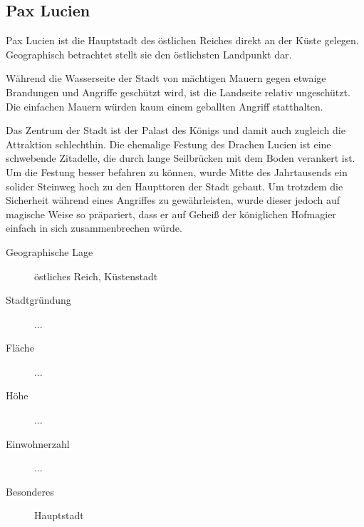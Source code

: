 \subsection{Pax Lucien}
\par Pax Lucien ist die Hauptstadt des östlichen Reiches direkt an der Küste gelegen. Geographisch betrachtet
stellt sie den östlichsten Landpunkt dar.
\par Während die Wasserseite der Stadt von mächtigen Mauern gegen etwaige Brandungen und Angriffe geschützt wird,
ist die Landseite relativ ungeschützt. Die einfachen Mauern würden kaum einem geballten Angriff statthalten.
\par Das Zentrum der Stadt ist der Palast des Königs und damit auch zugleich die Attraktion schlechthin. Die ehemalige
Festung des Drachen Lucien ist eine schwebende Zitadelle, die durch lange Seilbrücken mit dem Boden verankert ist.
Um die Festung besser befahren zu können, wurde Mitte des Jahrtausends ein solider Steinweg hoch zu den Haupttoren
der Stadt gebaut. Um trotzdem die Sicherheit während eines Angriffes zu gewährleisten, wurde dieser jedoch auf
magische Weise so präpariert, dass er auf Geheiß der königlichen Hofmagier einfach in sich zusammenbrechen würde.

\begin{description}
\item [Geographische Lage] östliches Reich, Küstenstadt
\item [Stadtgründung] ...
\item [Fläche] ...
\item [Höhe] ...
\item [Einwohnerzahl] ...
\item [Besonderes] Hauptstadt
\end{description}